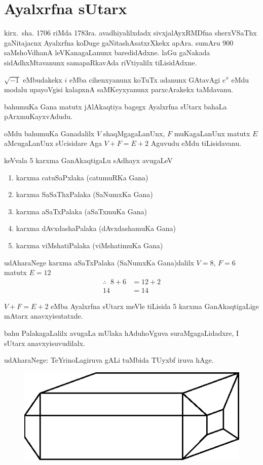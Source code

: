 \chapter{Ayalxrfna sUtarx}

\vskip -20pt

kirx.~sha. {\rm 1706} riMda {\rm 1783}ra. avadhiyalilxdadx sivxjalAyxRMDfna sherxVSaThx gaNitajacnx Ayalxrfna koDuge gaNitashAsatxrXkekx apAra. sumAru {\rm 900} saMshoVdhanA leVKanagaLanunx baredidAdxne. laGu gaNakada sidAdhxMtavanunx samapaRkavAda riVtiyalilx tiLisidAdxne.
\vskip 3pt

$\sqrt{-1}$ eMbudakekx $i$ eMba cihenxyanunx koTuTx adanunx GAtavAgi $e^x$ eMdu modalu upayoVgisi kalapxnA saMKeyxyanunx parxcArakekx taMdavanu.
\vskip 3pt

bahumuKa Gana matutx jAlAkaqtiya bagegx Ayalxrfna sUtarx bahaLa pArxmuKayx\-vAdudu.
\vskip 3pt

oMdu bahumuKa Ganadalilx $V$ shaqMgagaLanUnx, $F$ muKagaLanUnx matutx $E$ aMcugaLanUnx sUcisidare Aga $V+F=E+2$ Aguvudu eMdu tiLisidavanu. 
\vskip 3pt

keVvala {\rm 5} karxma GanAkaqtigaLu sAdhayx avugaLeV
\begin{enumerate}[{\rm 1)}]

\item karxma catuSaPxlaka (catumuRKa Gana)
\item karxma SaSaThxPalaka (SaNumxKa Gana)
\item karxma aSaTxPalaka (aSaTxmuKa Gana)
\item karxma dAvxdashaPalaka (dAvxdashamuKa Gana)
\item karxma viMshatiPalaka (viMshatimuKa Gana)
\end{enumerate}

\newpage
\phantom{a}

\vskip -0.7cm

udAharaNege karxma aSaTxPalaka (SaNumxKa Gana)dalilx \quad $V=8$, \quad $F=6$ matutx $E=12$
\begin{align*}
\therefore \;\; 8+6 &=12+2\\
14 &=14
\end{align*}

$V+F=E+2$ eMba Ayalxrfna sUtarx meVle tiLisida {\rm 5} karxma GanAkaqtigaLige mAtarx anavxyisutatxde.

bahu PalakagaLalilx avugaLa mUlaka hAduhoVguva suraMgagaLidadxre, I sUtarx anavxyisuvudilalx.

udAharaNege: TeYrinoLagiruva gALi tuMbida TUyxbf iruva hAge.
\begin{figure}[H]
\centering
\includegraphics{src/figures/m-147.eps}
\end{figure}

